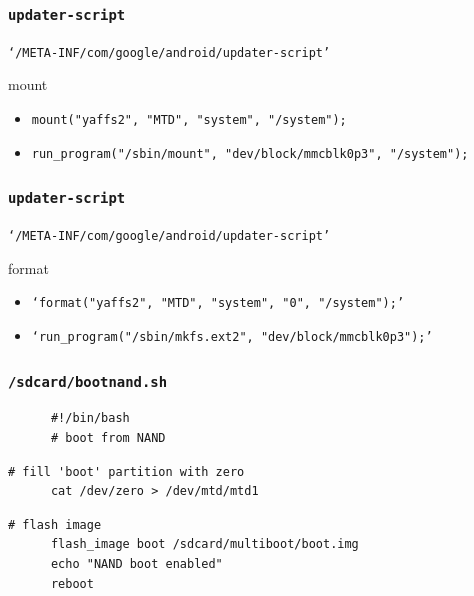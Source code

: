\documentclass{beamer}
\begin{document}
\begin{frame}
\frametitle{\tt {updater-script}}
\tt{`/META-INF/com/google/android/updater-script'}
\begin{block}
  {mount}
  \begin{itemize}
  \item \tt{mount("yaffs2", "MTD", "system", "/system");}
  \end{itemize}
  \begin{itemize}
  \item \tt{run\_program("/sbin/mount", "dev/block/mmcblk0p3", "/system");}
  \end{itemize}
\end{block}
\end{frame}
\begin{frame}
\frametitle{\tt {updater-script}}
\tt{`/META-INF/com/google/android/updater-script'}
\begin{block}
  {format}
  \begin{itemize}
  \item \tt{`format("yaffs2", "MTD", "system", "0", "/system");'}
  \end{itemize}
  \begin{itemize}
  \item \tt{`run\_program("/sbin/mkfs.ext2", "dev/block/mmcblk0p3");'} 
  \end{itemize}
\end{block}
\end{frame}
\begin{frame}[fragile]
  \frametitle{\texttt{/sdcard/bootnand.sh}}
  \begin{semiverbatim}
    \pause
    \begin{lstlisting}
      #!/bin/bash
      # boot from NAND 
    \end{lstlisting}

    \pause
    \begin{lstlisting}[firstnumber=last]
      # fill 'boot' partition with zero
      cat /dev/zero > /dev/mtd/mtd1
    \end{lstlisting}

    \pause
    \begin{lstlisting}[firstnumber=last]
      # flash image
      flash_image boot /sdcard/multiboot/boot.img
      echo "NAND boot enabled"
      reboot
    \end{lstlisting}

  \end{semiverbatim}
\end{frame}
\end{document}
